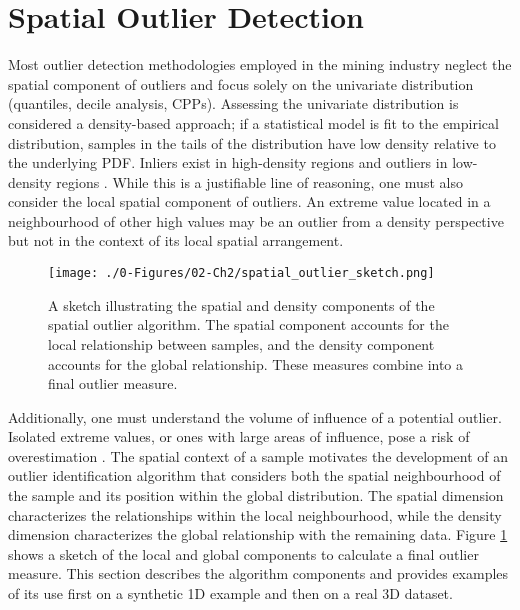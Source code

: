 \FloatBarrier
\section{Spatial Outlier Detection}
\label{sec:02spatial}

Most outlier detection methodologies employed in the mining industry neglect the spatial component of outliers and focus solely on the univariate distribution (quantiles, decile analysis, \glspl{CPP}). Assessing the univariate distribution is considered a density-based approach; if a statistical model is fit to the empirical distribution, samples in the tails of the distribution have low density relative to the underlying \gls{PDF}. Inliers exist in high-density regions and outliers in low-density regions \citep{geron2019hands}. While this is a justifiable line of reasoning, one must also consider the local spatial component of outliers. An extreme value located in a neighbourhood of other high values may be an outlier from a density perspective but not in the context of its local spatial arrangement.

\begin{figure}[htb!]
    \centering
    \texttt{[image: ./0-Figures/02-Ch2/spatial\_outlier\_sketch.png]}
    \caption{A sketch illustrating the spatial and density components of the spatial outlier algorithm. The spatial component accounts for the local relationship between samples, and the density component accounts for the global relationship. These measures combine into a final outlier measure.}
    \label{fig:spatial_outlier_sketch}
\end{figure}


Additionally, one must understand the volume of influence of a potential outlier. Isolated extreme values, or ones with large areas of influence, pose a risk of overestimation \citep{leuangthong2015dealing}. The spatial context of a sample motivates the development of an outlier identification algorithm that considers both the spatial neighbourhood of the sample and its position within the global distribution. The spatial dimension characterizes the relationships within the local neighbourhood, while the density dimension characterizes the global relationship with the remaining data. Figure \ref{fig:spatial_outlier_sketch} shows a sketch of the local and global components to calculate a final outlier measure. This section describes the algorithm components and provides examples of its use first on a synthetic \gls{1D} example and then on a real \gls{3D} dataset.

